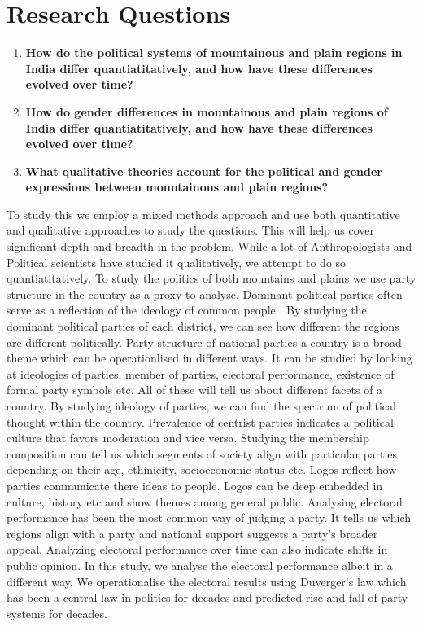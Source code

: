 \section{Research Questions}

\begin{enumerate}
    \item \textbf{How do the political systems of mountainous and plain regions in India differ quantiatitatively, and how have these differences evolved over time? }
    \item \textbf{How do gender differences in mountainous and plain regions of India differ quantiatitatively, and how have these differences evolved over time?}
    \item \textbf{What qualitative theories account for the political and gender expressions between mountainous and plain regions?}
\end{enumerate}

To study this we employ a mixed methods approach and use both quantitative and qualitative approaches to study the questions. This will help us cover significant depth and breadth in the problem. While a lot of Anthropologists and Political scientists have studied it qualitatively, we attempt to do so quantiatitatively. To study the politics of both mountains and plains we use party structure in the country as a proxy to analyse. Dominant political parties often serve as a reflection of the ideology of common people \citep{romeijn2020political}. By studying the dominant political parties of each district, we can see how different the regions are different politically. Party structure of national parties a country is a broad theme which can be operationlised in different ways. It can be studied by looking at ideologies of parties, member of parties, electoral performance, existence of formal party symbols etc. All of these will tell us about different facets of a country. By studying ideology of parties, we can find the spectrum of political thought within the country. Prevalence of centrist parties indicates a political culture that favors moderation and vice versa. Studying the membership composition can tell us  which segments of society align with particular parties depending on their age, ethinicity, socioeconomic status etc. Logos reflect how parties communicate there ideas to people. Logos can be deep embedded in culture, history etc and show themes among general public. Analysing electoral performance has been the most common way of judging a party. It tells us which regions align with a party and national support suggests a party's broader appeal. Analyzing electoral performance over time can also indicate shifts in public opinion. In this study, we analyse the electoral performance albeit in a different way. We operationalise the electoral results using Duverger's law which has been a central law in politics for decades and predicted rise and fall of party systems for decades. 

